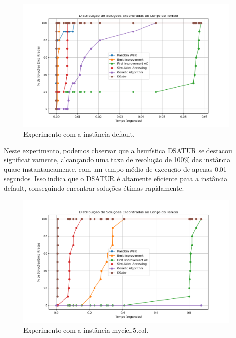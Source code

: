 \documentclass[12pt,a4paper]{article}
\begin{document}
\begin{figure}[H]
    \centering
    \includegraphics[width=1\textwidth]{./img/output-default.png}
    \caption{Experimento com a instância default.}
    \label{fig:experimento-default}
\end{figure}

Neste experimento, podemos observar que a heurística DSATUR se destacou significativamente, alcançando uma taxa de resolução de 100\% das instância quase instantaneamente, com um tempo médio de execução de apenas 0.01 segundos. Isso indica que o DSATUR é altamente eficiente para a instância default, conseguindo encontrar soluções ótimas rapidamente.

\begin{figure}[H]
    \centering
    \includegraphics[width=1\textwidth]{./img/output-myciel5.png}
    \caption{Experimento com a instância myciel.5.col.}
    \label{fig:experimento-myciel5}
\end{figure}
\end{document}
